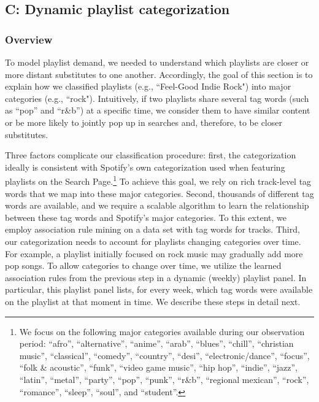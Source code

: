 \documentclass[12pt, a4paper, leqno]{article}
\begin{document}

\subsection*{C: Dynamic playlist categorization}
\label{details_mining}

\setcounter{figure}{0}

\setcounter{table}{0}

\setcounter{equation}{0}

\renewcommand\thefigure{C\arabic{figure}}
\renewcommand\thetable{C\arabic{table}}
\renewcommand\theequation{C\arabic{equation}}

\subsubsection*{Overview}

To model playlist demand, we needed to understand which playlists are closer or more distant substitutes to one another. Accordingly, the goal of this section is to explain how we classified playlists (e.g., ``Feel-Good Indie Rock") into major categories (e.g., ``rock"). Intuitively, if two playlists share several tag words (such as ``pop” and ``r\&b”) at a specific time, we consider them to have similar content or be more likely to jointly pop up in searches and, therefore, to be closer substitutes.

Three factors complicate our classification procedure: first, the categorization ideally is consistent with Spotify's own categorization used when featuring playlists on the Search Page.\footnote{We focus on the following major categories available during our observation period: {``afro'', ``alternative'', ``anime'',  ``arab'', ``blues'', ``chill'', ``christian music'',  ``classical'', ``comedy'', ``country'', ``desi'', ``electronic/dance'', ``focus'', ``folk} \&  {acoustic'', ``funk'', ``video game music'', ``hip hop'', ``indie'', ``jazz'', ``latin'', ``metal'', ``party'', ``pop'', ``punk'', ``r}\&{b'', ``regional mexican'', ``rock'', ``romance'', ``sleep'', ``soul'', and ``student''}.} To achieve this goal, we rely on rich track-level tag words that we map into these major categories.
Second, thousands of different tag words are available, and we require a scalable algorithm to learn the relationship between these tag words and Spotify's major categories. To this extent, we employ association rule mining \citep{hastie_09} on a data set with tag words for tracks. Third, our categorization needs to account for playlists changing categories over time. For example, a playlist initially focused on rock music may gradually add more pop songs. To allow categories to change over time, we utilize the learned association rules from the previous step in a dynamic (weekly) playlist panel. In particular, this playlist panel lists, for every week, which tag words were available on the playlist at that moment in time. We describe these steps in detail next.
\end{document}
